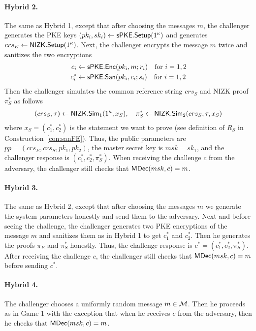 \documentclass{llncs}
\begin{document}
\paragraph{Hybrid 2.} The same as Hybrid 1, except that after choosing the messages $m$, the challenger generates the PKE keys $(pk_i,sk_i) \leftarrow \mathsf{sPKE}.\mathsf{Setup}(1^\kappa)$ and generates $crs_E \leftarrow \mathsf{NIZK}.\mathsf{Setup}(1^\kappa)$. 
Next, the challenger encrypts the message $m$ twice and sanitizes the two encryptions
	\begin{align*}
	c_i &\leftarrow \mathsf{sPKE}.\mathsf{Enc}(pk_i,m;r_i) \quad \text{for } i = 1,2 \\
	c^*_i &\leftarrow \mathsf{sPKE}.\mathsf{San}(pk_i,c_i;s_i) \quad \text{for } i = 1,2 
	\end{align*}
Then the challenger simulates the common reference string $crs_S$ and NIZK proof $\pi_S^*$ as follows
	\begin{align*}
	(crs_S,\tau) \leftarrow \mathsf{NIZK}.\mathsf{Sim}_1(1^\kappa,x_S), \quad \pi_S^* \leftarrow \mathsf{NIZK}.\mathsf{Sim}_2(crs_S, \tau, x_S)
	\end{align*}
	where $x_S = (c_1^*,c_2^*)$ is the statement we want to prove (see definition of $R_S$ in Construction~\ref{con:sanFE}). 
Thus, the public parameters are $pp = (crs_E, crs_S, pk_1, pk_2)$, the master secret key is $msk = sk_1$, and the challenger response is $(c^*_1,c^*_2,\pi_S^*)$.
When receiving the challenge $c$ from the adversary, the challenger still checks that $\mathsf{MDec}(msk,c) = m$.

\paragraph{Hybrid 3.} The same as Hybrid 2, except that after choosing the messages $m$ we generate the system parameters honestly and send them to the adversary. 
Next and before seeing the challenge, the challenger generates two PKE encryptions of the message $m$ and sanitizes them as in Hybrid 1 to get $c^*_1$ and $c^*_2$. Then he generates the proofs $\pi_E$ and $\pi_S^*$ honestly. Thus, the challenge response is $c^* = (c^*_1,c^*_2,\pi_S^*)$.
After receiving the challenge $c$, the challenger still checks that $\mathsf{MDec}(msk,c) = m$ before sending $c^*$.

\paragraph{Hybrid 4.} The challenger chooses a uniformly random message $m \in \mathcal{M}$. Then he proceeds as in Game 1 with the exception that when he receives $c$ from the adversary, then he checks that $\mathsf{MDec}(msk,c) = m$. \\
\end{document}
